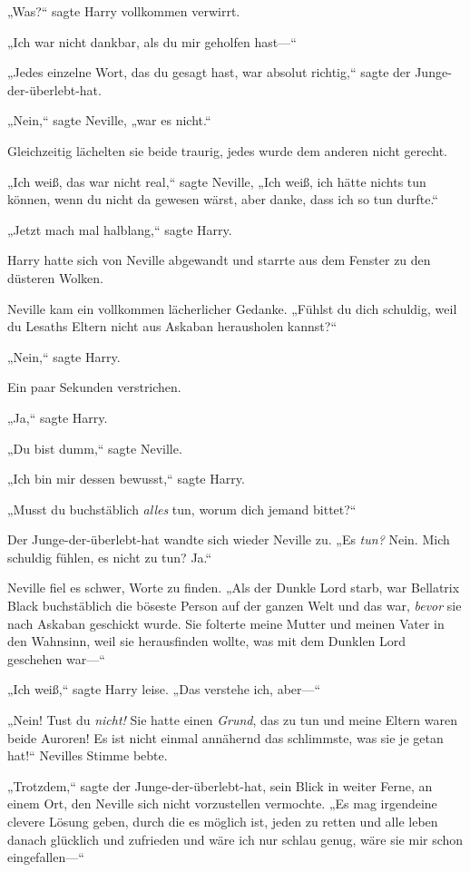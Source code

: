 {„Was?“ sagte Harry vollkommen verwirrt.

„Ich war nicht dankbar, als du mir geholfen hast—“

„Jedes einzelne Wort, das du gesagt hast, war absolut richtig,“ sagte der Junge-der-überlebt-hat.

„Nein,“ sagte Neville, „war es nicht.“

Gleichzeitig lächelten sie beide traurig, jedes wurde dem anderen nicht gerecht.

„Ich weiß, das war nicht real,“ sagte Neville, „Ich weiß, ich hätte nichts tun können, wenn du nicht da gewesen wärst, aber danke, dass ich so tun durfte.“

„Jetzt mach mal halblang,“ sagte Harry.

Harry hatte sich von Neville abgewandt und starrte aus dem Fenster zu den düsteren Wolken.

Neville kam ein vollkommen lächerlicher Gedanke. „Fühlst du dich schuldig, weil du Lesaths Eltern nicht aus Askaban herausholen kannst?“

„Nein,“ sagte Harry.

Ein paar Sekunden verstrichen.

„Ja,“ sagte Harry.

„Du bist dumm,“ sagte Neville.

„Ich bin mir dessen bewusst,“ sagte Harry.

„Musst du buchstäblich \emph{alles} tun, worum dich jemand bittet?“

Der Junge-der-überlebt-hat wandte sich wieder Neville zu. „Es \emph{tun?} Nein. Mich schuldig fühlen, es nicht zu tun? Ja.“

Neville fiel es schwer, Worte zu finden. „Als der Dunkle Lord starb, war Bellatrix Black buchstäblich die böseste Person auf der ganzen Welt und das war, \emph{bevor} sie nach Askaban geschickt wurde. Sie folterte meine Mutter und meinen Vater in den Wahnsinn, weil sie herausfinden wollte, was mit dem Dunklen Lord geschehen war—“

„Ich weiß,“ sagte Harry leise. „Das verstehe ich, aber—“

„Nein! Tust du \emph{nicht!} Sie hatte einen \emph{Grund}, das zu tun und meine Eltern waren beide Auroren! Es ist nicht einmal annähernd das schlimmste, was sie je getan hat!“ Nevilles Stimme bebte.

„Trotzdem,“ sagte der Junge-der-überlebt-hat, sein Blick in weiter Ferne, an einem Ort, den Neville sich nicht vorzustellen vermochte. „Es mag irgendeine clevere Lösung geben, durch die es möglich ist, jeden zu retten und alle leben danach glücklich und zufrieden und wäre ich nur schlau genug, wäre sie mir schon eingefallen—“

}
